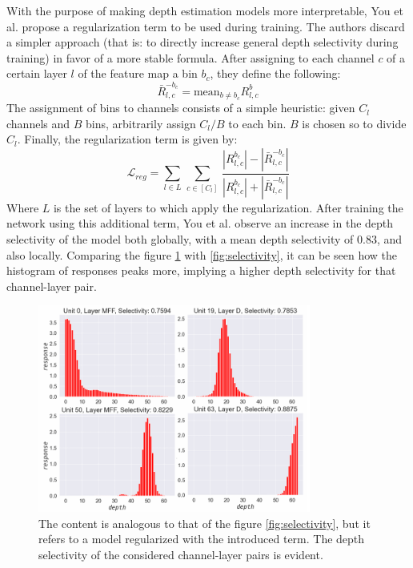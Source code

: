 With the purpose of making depth estimation models more interpretable, You et al. propose a regularization term to be used during training.
The authors discard a simpler approach (that is: to directly increase general depth selectivity during training) in favor of a more stable formula.
After assigning to each channel $c$ of a certain layer $l$ of the feature map a bin $b_{c}$, they define the following:
\[
    \bar{R}_{l, c}^{-b_{c}} = \text{mean}_{b \neq b_{c}} R_{l, c}^{b}
\]
The assignment of bins to channels consists of a simple heuristic: given $C_{l}$ channels and $B$ bins, arbitrarily assign $C_{l} / B$ to each bin.
$B$ is chosen so to divide $C_{l}$.
Finally, the regularization term is given by:
\[
    \mathcal{L}_{reg} =
    \sum_{l \in L} \,
    \sum_{c \in [C_{l}]} \,
        \frac
            {|R_{l, c}^{b_{c}}| - |\bar{R}_{l, c}^{-b_{c}}|}
            {|R_{l, c}^{b_{c}}| + |\bar{R}_{l, c}^{-b_{c}}|}
\]
Where $L$ is the set of layers to which apply the regularization.
After training the network using this additional term, You et al. observe an increase in the depth selectivity of the model both globally, with a mean depth selectivity of 0.83, and also locally.
Comparing the figure \ref{fig:increased_selectivity}  with \ref{fig:selectivity}, it can be seen how the histogram of responses peaks more, implying a higher depth selectivity for that channel-layer pair.

\begin{figure}
    \centering
    \includegraphics[width=0.8\textwidth]{figs/increased_selectivity}
    \caption{
        The content is analogous to that of the figure \ref{fig:selectivity}, but it refers to a model regularized with the introduced term.
        The depth selectivity of the considered channel-layer pairs is evident.
        \label{fig:increased_selectivity}
    }
\end{figure}

